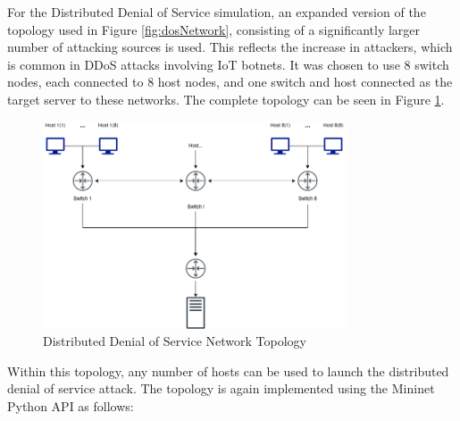 For the Distributed Denial of Service simulation, an expanded version of the
topology used in Figure \ref{fig:dosNetwork}, consisting of a significantly
larger number of attacking sources is used. This reflects the increase in
attackers, which is common in DDoS attacks involving IoT botnets. It was chosen
to use 8 switch nodes, each connected to 8 host nodes, and one switch and host
connected as the target server to these networks. The complete topology can be
seen in Figure \ref{fig:ddosNetwork}.

\begin{figure}[H]
	\centering
	\includegraphics[width=0.8\textwidth]{images/DDoS}
	\caption{Distributed Denial of Service Network Topology}
	\label{fig:ddosNetwork}
\end{figure}

Within this topology, any number of hosts can be used to launch the distributed
denial of service attack. The topology is again implemented using the Mininet
Python API as follows:

